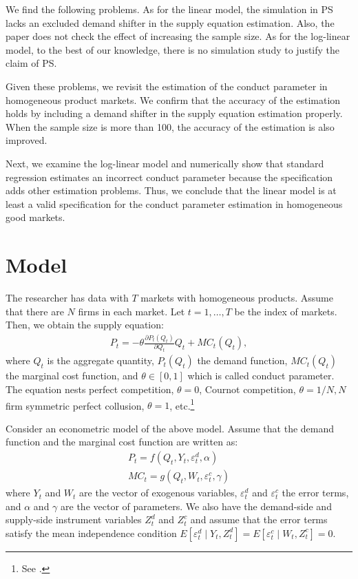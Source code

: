 \documentclass[11pt, a4paper]{article}
\begin{document}
We find the following problems.
As for the linear model, the simulation in PS lacks an excluded demand shifter in the supply equation estimation. 
Also, the paper does not check the effect of increasing the sample size. 
As for the log-linear model, to the best of our knowledge, there is no simulation study to justify the claim of PS.

Given these problems, we revisit the estimation of the conduct parameter in homogeneous product markets.
We confirm that the accuracy of the estimation holds by including a demand shifter in the supply equation estimation properly. 
When the sample size is more than 100, the accuracy of the estimation is also improved.

Next, we examine the log-linear model and numerically show that standard regression estimates an incorrect conduct parameter because the specification adds other estimation problems.
Thus, we conclude that the linear model is at least a valid specification for the conduct parameter estimation in homogeneous good markets.



\section{Model}
The researcher has data with $T$ markets with homogeneous products.
Assume that there are $N$ firms in each market.
Let $t = 1,\ldots, T$ be the index of markets.
Then, we obtain the supply equation:
\begin{align}
     P_t = -\theta\frac{\partial P_t(Q_t)}{\partial Q_t}Q_t + MC_t(Q_t),\label{eq:supply_equation}
\end{align}
where $Q_t$ is the aggregate quantity, $P_t(Q_{t})$ the demand function, $MC_{t}(Q_{t})$ the marginal cost function, and $\theta\in[0,1]$ which is called conduct parameter. 
The equation nests perfect competition, $\theta=0$, Cournot competition, $\theta=1/N, N$ firm symmetric perfect collusion, $\theta=1$, etc.\footnote{See \cite{bresnahan1982oligopoly}.} 

Consider an econometric model of the above model.
Assume that the demand function and the marginal cost function are written as: 
\begin{align}
    P_t = f(Q_t, Y_t, \varepsilon^{d}_{t}, \alpha) \label{eq:demand}\\
    MC_t = g(Q_t, W_{t}, \varepsilon^{c}_{t}, \gamma)\label{eq:marginal_cost}
\end{align}
where $Y_t$ and $W_{t}$ are the vector of exogenous variables, $\varepsilon^{d}_{t}$ and $\varepsilon^{c}_{t}$ the error terms, and $\alpha$ and $\gamma$ are the vector of parameters.
We also have the demand-side and supply-side instrument variables $Z^{d}_{t}$ and $Z^{c}_{t}$ and assume that the error terms satisfy the mean independence condition $E[\varepsilon^{d}_{t}\mid Y_t, Z^{d}_{t}] = E[\varepsilon^{c}_{t} \mid W_{t}, Z^{c}_{t}] =0$.
\end{document}
